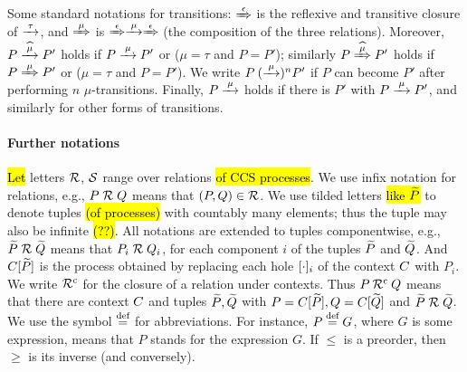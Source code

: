 Some standard notations for transitions: $\Arr\epsilon$ is the 
reflexive and transitive closure of $\arr\tau$, and 
$\Arr \mu $ is $\Arr\epsilon \arr\mu \Arr\epsilon$ (the
composition of the three relations).
Moreover,   
$ P \arcap \mu P'$ holds if $P \arr\mu P'$ or ($\mu =\tau$ and
$P=P'$); similarly 
$ P \Arcap \mu P'$ holds if $P \Arr\mu P'$ or ($\mu =\tau$ and
$P=P'$).
We write $P \:(\arr\mu)^n P'$ if $P$ can become $P'$ after performing
$n$ $\mu$-transitions. Finally, $P \arr\mu$ holds if there is $P'$
with $P \arr\mu P'$, and similarly for other forms of transitions.

\paragraph{Further notations}
\hl{Let} letters $\R$, $\S$ range over relations \hl{of CCS processes}.
We use infix notation for relations, e.g., 
$P \RR Q$ means that $(P,Q) \in \R$.
We use tilded letters \hl{like $\til P$} to denote tuples \hl{(of processes)} with
countably many elements; thus the tuple may also be infinite \hl{(??)}.
All notations are extended to tuples componentwise,
e.g., $\til P \RR \til Q$ means that $P_i \RR Q_i$, for each  
component $i$ of the tuples $\til P$ and $\til Q$.
And $\ct{\til P}$ is the process obtained by replacing each hole
$\holei i$ of the  context $\qct$ with $P_i$.  
We write $
\ctx \R$ for the closure of a relation under contexts. Thus $P\: \ctx \R\: Q$
means that there are context $\qct$ and tuples $\til P,\til Q$ with
$P =  \ct{\til P}, Q =  \ct{\til Q}$ and $\til P \RR \til Q$.
We use the symbol $\DSdefi$ for abbreviations. For instance, $P \DSdefi G $, where
$G$ is some expression, means that $P$ stands for the expression $G$.
If $\leq$ is a preorder, then  $\geq$  is its inverse (and
conversely).


